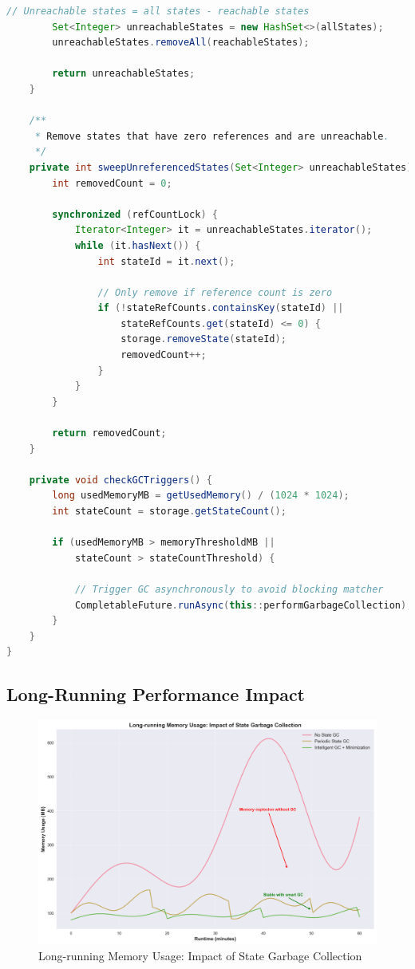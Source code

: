 \documentclass[11pt,a4paper]{article}
\begin{document}
\begin{lstlisting}[language=Java,caption={State Garbage Collection Implementation}]
        // Unreachable states = all states - reachable states
        Set<Integer> unreachableStates = new HashSet<>(allStates);
        unreachableStates.removeAll(reachableStates);
        
        return unreachableStates;
    }
    
    /**
     * Remove states that have zero references and are unreachable.
     */
    private int sweepUnreferencedStates(Set<Integer> unreachableStates) {
        int removedCount = 0;
        
        synchronized (refCountLock) {
            Iterator<Integer> it = unreachableStates.iterator();
            while (it.hasNext()) {
                int stateId = it.next();
                
                // Only remove if reference count is zero
                if (!stateRefCounts.containsKey(stateId) || 
                    stateRefCounts.get(stateId) <= 0) {
                    storage.removeState(stateId);
                    removedCount++;
                }
            }
        }
        
        return removedCount;
    }
    
    private void checkGCTriggers() {
        long usedMemoryMB = getUsedMemory() / (1024 * 1024);
        int stateCount = storage.getStateCount();
        
        if (usedMemoryMB > memoryThresholdMB || 
            stateCount > stateCountThreshold) {
            
            // Trigger GC asynchronously to avoid blocking matcher
            CompletableFuture.runAsync(this::performGarbageCollection);
        }
    }
}
\end{lstlisting}

\subsection{Long-Running Performance Impact}

\begin{figure}[H]
\centering
\includegraphics[width=\textwidth]{illustrations/gc_impact.png}
\caption{Long-running Memory Usage: Impact of State Garbage Collection}
\label{fig:gc_impact}
\end{figure}
\end{document}
